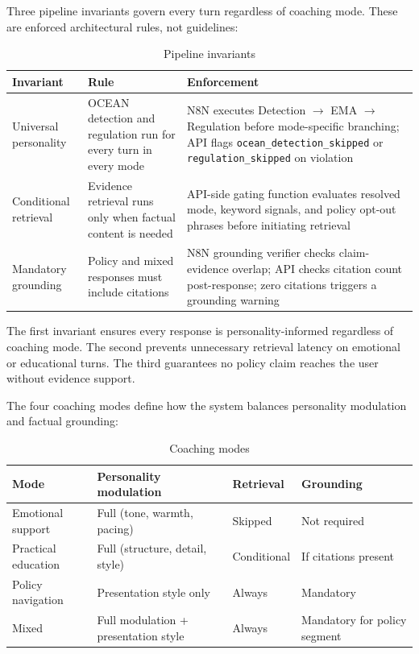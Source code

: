 \documentclass[10pt,a4paper]{report}
\begin{document}
Three pipeline invariants govern every turn regardless of coaching mode. These are enforced architectural rules, not guidelines:

\begin{table}[H]
\centering\small
\caption{Pipeline invariants}
\begin{tabularx}{\textwidth}{@{}lXX@{}}
\toprule
Invariant & Rule & Enforcement \\
\midrule
Universal personality & OCEAN detection and regulation run for every turn in every mode & N8N executes Detection $\rightarrow$ EMA $\rightarrow$ Regulation before mode-specific branching; API flags \texttt{ocean\_detection\_skipped} or \texttt{regulation\_skipped} on violation \\
Conditional retrieval & Evidence retrieval runs only when factual content is needed & API-side gating function evaluates resolved mode, keyword signals, and policy opt-out phrases before initiating retrieval \\
Mandatory grounding & Policy and mixed responses must include citations & N8N grounding verifier checks claim-evidence overlap; API checks citation count post-response; zero citations triggers a grounding warning \\
\bottomrule
\end{tabularx}
\end{table}

The first invariant ensures every response is personality-informed regardless of coaching mode. The second prevents unnecessary retrieval latency on emotional or educational turns. The third guarantees no policy claim reaches the user without evidence support.

The four coaching modes define how the system balances personality modulation and factual grounding:

\begin{table}[H]
\centering\small
\caption{Coaching modes}
\begin{tabularx}{\textwidth}{@{}lXXX@{}}
\toprule
Mode & Personality modulation & Retrieval & Grounding \\
\midrule
Emotional support & Full (tone, warmth, pacing) & Skipped & Not required \\
Practical education & Full (structure, detail, style) & Conditional & If citations present \\
Policy navigation & Presentation style only & Always & Mandatory \\
Mixed & Full modulation + presentation style & Always & Mandatory for policy segment \\
\bottomrule
\end{tabularx}
\end{table}
\end{document}

